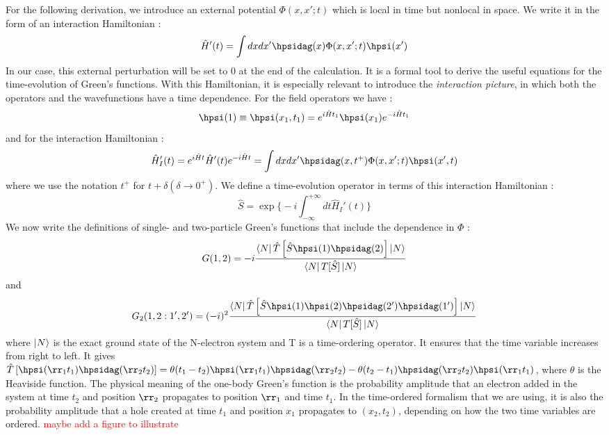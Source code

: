 For the following derivation, we introduce an external potential $\Phi(x,x';t)$ which is local in time but nonlocal in space. We write it in the form of an interaction Hamiltonian :
\begin{equation}
	\hat{H}'(t) = \int dx dx' \hpsidag(x) \Phi(x,x';t) \hpsi(x') 
\end{equation}
In our case, this external perturbation will be set to 0 at the end of the calculation. It is a formal tool to derive the useful equations for the time-evolution of Green's functions. With this Hamiltonian, it is especially relevant to introduce the \textit{interaction picture}, in which both the operators and the wavefunctions have a time dependence.\cite{martin2016interacting} For the field operators we have :
\begin{equation}
	\hpsi(1) \equiv \hpsi(x_1, t_1) = e^{i\hat{H} t_1} \hpsi(x_1) e^{-i\hat{H} t_1}
\end{equation}
and for the interaction Hamiltonian :
\begin{equation}
	\hat{H}_I'(t) = e^{i\hat{H} t} \hat{H}'(t) e^{-i\hat{H} t} = \int dx dx' \hpsidag(x,t^+) \Phi(x,x';t) \hpsi(x',t)
\end{equation}
where we use the notation $t^+$ for $t+\delta (\delta \to 0^+)$. We define a time-evolution operator in terms of this interaction Hamiltonian :
\begin{equation}
	\hat{S} = \exp\biggl\{ -i \int_{-\infty}^{+\infty} dt \hat{H}_I'(t) \biggr\} \label{eq:def_time_ev_op}
\end{equation}
We now write the definitions of single- and two-particle Green's functions that include the dependence in $\Phi$ :
\begin{equation}
	G(1,2) = -i \frac{\bra{N}\hat{T}\left[\hat{S}\hpsi(1)\hpsidag(2)\right]\ket{N}}{\bra{N}T[\hat{S}]\ket{N}} \label{eq:GF}
\end{equation}
and
\begin{equation}
	G_2(1,2:1',2') = (-i)^2  \frac{\bra{N}\hat{T}\left[\hat{S}\hpsi(1)\hpsi(2)\hpsidag(2')\hpsidag(1')\right]\ket{N}}{\bra{N}T[\hat{S}]\ket{N}}\label{eq:2GF}
\end{equation}
where $\ket{N}$ is the exact ground state of the N-electron system and T is a time-ordering operator. It ensures that the time variable increases from right to left. It gives $\hat{T}\left[ \hpsi(\rr_1 t_1) \hpsidag(\rr_2 t_2) \right] = \theta(t_1 - t_2) \hpsi(\rr_1 t_1) \hpsidag(\rr_2 t_2) - \theta(t_2-t_1)\hpsidag(\rr_2 t_2)\hpsi(\rr_1 t_1)$, where $\theta$ is the Heaviside function.\cite{fetter2012quantum} The physical meaning of the one-body Green's function is the probability amplitude that an electron added in the system at time $t_2$ and position $\rr_2$ propagates to position $\rr_1$ and time $t_1$. In the time-ordered formalism that we are using, it is also the probability amplitude that a hole created at time $t_1$ and position $x_1$ propagates to $(x_2,t_2)$, depending on how the two time variables are ordered. \textcolor{red}{maybe add a figure to illustrate}

